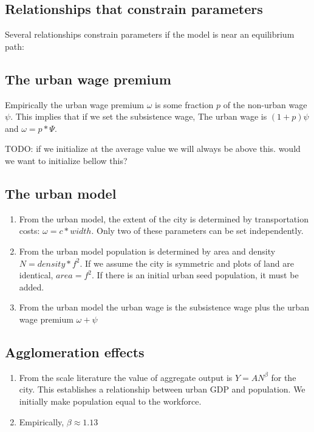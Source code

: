 \subsection{Relationships that constrain parameters }

Several relationships constrain parameters if the model is near an equilibrium path: 

\subsection{The urban wage premium}

Empirically the urban wage premium $\omega$ is some fraction $p$ of the non-urban wage $\psi$.   This implies that if we set the subsistence wage, The urban wage is $(1+p)\psi$ and $\omega= p*\Psi$.

TODO: if we initialize at the average value we will always be above this. would we want to initialize bellow this?

\subsection{The urban model}
\begin{enumerate}
    \item From the urban model, the extent of the city is determined by transportation costs:   $\omega =c*width$.  Only two of these parameters can be set independently.

    \item From the urban model population is determined by area and density   $N=density* f^2$. If we assume the city is symmetric  and plots  of land are identical, $area=f^2$. If there is an initial urban seed population, it must be added.  
   
    \item From the urban model the urban wage is the subsistence wage plus the urban wage premium $\omega+\psi$ 
\end{enumerate}

\subsection{Agglomeration effects}
\begin{enumerate}
    \item From the scale literature the value of aggregate output is $Y=AN^\beta$ for the city. This establishes a relationship between urban GDP and population. We initially make population equal to the workforce. 

    \item Empirically, $\beta \approx 1.13$
\end{enumerate}

